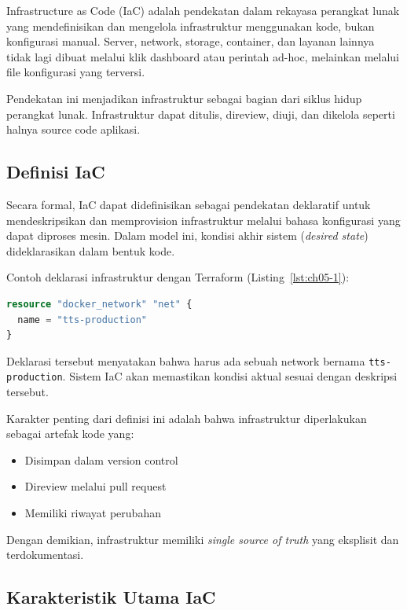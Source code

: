 Infrastructure as Code (IaC) adalah pendekatan dalam rekayasa perangkat lunak yang mendefinisikan dan mengelola infrastruktur menggunakan kode, bukan konfigurasi manual. Server, network, storage, container, dan layanan lainnya tidak lagi dibuat melalui klik dashboard atau perintah ad-hoc, melainkan melalui file konfigurasi yang terversi.

Pendekatan ini menjadikan infrastruktur sebagai bagian dari siklus hidup perangkat lunak. Infrastruktur dapat ditulis, direview, diuji, dan dikelola seperti halnya source code aplikasi.

\subsection{Definisi IaC}

Secara formal, IaC dapat didefinisikan sebagai pendekatan deklaratif untuk mendeskripsikan dan memprovision infrastruktur melalui bahasa konfigurasi yang dapat diproses mesin. Dalam model ini, kondisi akhir sistem (\textit{desired state}) dideklarasikan dalam bentuk kode.

Contoh deklarasi infrastruktur dengan Terraform (Listing~\ref{lst:ch05-1}):

\begin{lstlisting}[language=terraform, caption={Potongan kode Terraform pada Definisi IaC}, label={lst:ch05-1}]
resource "docker_network" "net" {
  name = "tts-production"
}
\end{lstlisting}

Deklarasi tersebut menyatakan bahwa harus ada sebuah network bernama \texttt{tts-production}. Sistem IaC akan memastikan kondisi aktual sesuai dengan deskripsi tersebut.

Karakter penting dari definisi ini adalah bahwa infrastruktur diperlakukan sebagai artefak kode yang:

\begin{itemize}
\item Disimpan dalam version control
\item Direview melalui pull request
\item Memiliki riwayat perubahan
\end{itemize}

Dengan demikian, infrastruktur memiliki \textit{single source of truth} yang eksplisit dan terdokumentasi.

\subsection{Karakteristik Utama IaC}

